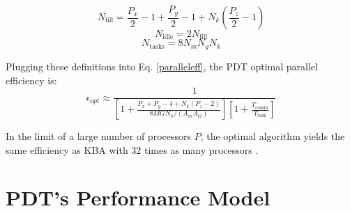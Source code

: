 \begin{equation}
N_\text{fill} = \frac{P_x}{2} - 1 + \frac{P_y}{2} - 1 + N_k (\frac{P_z}{2} - 1)
\label{nfill}
\end{equation}
\begin{equation}
N_\text{idle} = 2N_{\text{fill}}
\label{nidle}
\end{equation}
\begin{equation}
N_\text{tasks} = 8N_mN_gN_k
\label{ntasks}
\end{equation}

Plugging these definitions into Eq. \ref{paralleleff}, the PDT optimal parallel efficiency\cite{mpadams2013} is:
\begin{equation}
	\epsilon_{opt} \approx \frac{1}{ [1 + \frac{P_x + P_y - 4 + N_k(P_z -2)}{8MGN_k/(A_m A_G)} ]  [ 1 +  \frac{T_{\text{comm}}}{T_{\text{task}}} ]}
	\label{eps_opt}
\end{equation}

In the limit of a large number of processors $P$, the optimal algorithm yields the same efficiency as KBA with 32 times as many processors \cite{mpadams2013, mpadams2015}. 

\section{PDT's Performance Model}

